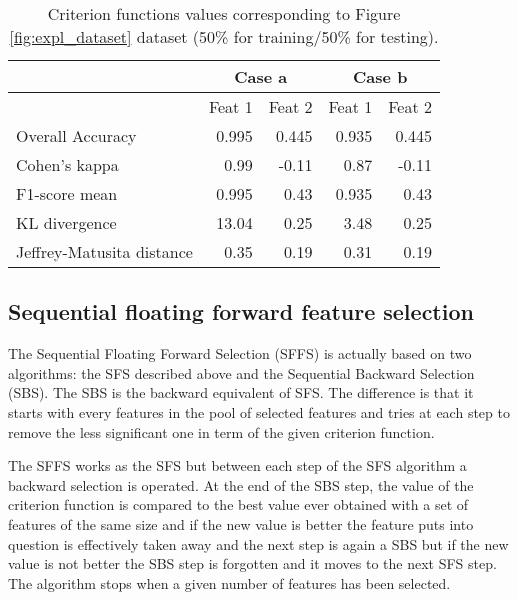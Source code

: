 \documentclass[a4paper,11pt,DIV=16]{scrartcl}
\begin{document}
    \begin{table}[!ht]
        \centering
        \begin{tabular}{l|r|r|r|r}
             & \multicolumn{2}{c|}{Case a} & \multicolumn{2}{c}{Case b} \\
            \hline
             & Feat 1 & Feat 2 & Feat 1 & Feat 2 \\
            \hline
            Overall Accuracy          & 0.995 & 0.445 & 0.935 & 0.445  \\
            Cohen's kappa             & 0.99  & -0.11 & 0.87  & -0.11 \\
            F1-score mean             & 0.995 & 0.43  & 0.935 & 0.43 \\
            KL divergence             & 13.04 & 0.25  & 3.48  & 0.25 \\
            Jeffrey-Matusita distance & 0.35  & 0.19  & 0.31  & 0.19 \\
        \end{tabular}
        \caption{Criterion functions values corresponding to Figure \ref{fig:expl_dataset} dataset (50\% for training/50\% for testing).\label{tab:expl_metric}}
    \end{table}


    \subsection{Sequential floating forward feature selection}
    \label{sec:floating-presentation}

    The Sequential Floating Forward Selection (SFFS) is actually based on two algorithms: the SFS described above and the Sequential Backward Selection (SBS). The SBS is the backward equivalent of SFS. The difference is that it starts with every features in the pool of selected features and tries at each step to remove the less significant one in term of the given criterion function.

    The SFFS works as the SFS but between each step of the SFS algorithm a backward selection is operated. At the end of the SBS step, the value of the criterion function is compared to the best value ever obtained with a set of features of the same size and if the new value is better the feature puts into question is effectively taken away and the next step is again a SBS but if the new value is not better the SBS step is forgotten and it moves to the next SFS step. The algorithm stops when a given number of features has been selected.
\end{document}
